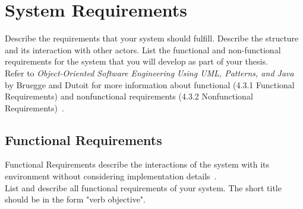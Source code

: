 \section*{System Requirements}

\begin{tcolorbox}
	Describe the requirements that your system should fulfill. 
	Describe the structure and its interaction with other actors. 
	List the functional and non-functional requirements for the system that you will develop as part of your thesis. 
	\\
	Refer to \textit{Object-Oriented Software Engineering Using UML, Patterns, and Java} by Bruegge and Dutoit for more information about functional (4.3.1 Functional Requirements) and nonfunctional requirements (4.3.2 Nonfunctional Requirements)~\cite{bruegge2013object}.
\end{tcolorbox}

\subsection*{Functional Requirements}

\begin{tcolorbox}
	Functional Requirements describe the interactions of the system with its environment without considering implementation details~\cite{bruegge2013object}.
	\\
	List and describe all functional requirements of your system.
	The short title should be in the form "verb objective". 
\end{tcolorbox}

